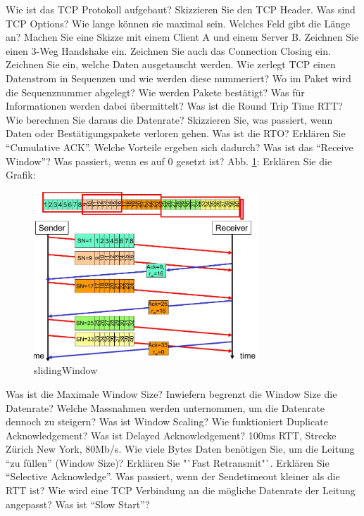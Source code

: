 \documentclass[ngerman,a4paper,12pt]{scrreprt}
\begin{document}
\olR
	\li Wie ist das TCP Protokoll aufgebaut? Skizzieren Sie den TCP Header.
	\li Was sind TCP Options? Wie lange können sie maximal sein. Welches Feld gibt die Länge an?
	\li Machen Sie eine Skizze mit einem Client A und einem Server B. Zeichnen Sie einen 3-Weg Handshake ein. Zeichnen Sie auch das Connection Closing ein. Zeichnen Sie ein, welche Daten ausgetauscht werden.
	\li Wie zerlegt TCP einen Datenstrom in Sequenzen und wie werden diese nummeriert? Wo im Paket wird die Sequenznummer abgelegt?
	 \li Wie werden Pakete bestätigt? Was für Informationen werden dabei übermittelt?
	 \li Was ist die Round Trip Time RTT? Wie berechnen Sie daraus die Datenrate?
	 \li Skizzieren Sie, was passiert, wenn Daten oder Bestätigungspakete verloren gehen. Was ist die RTO?
	 \li Erklären Sie "`Cumulative ACK"'. Welche Vorteile ergeben sich dadurch?
	 \li Was ist das "`Receive Window"'? Was passiert, wenn es auf 0 gesetzt ist?
	 \li Abb. \ref{slidingWindow}: Erklären Sie die Grafik:	 
		\begin{figure}[H]
			\centering
			\includegraphics[width=0.75\textwidth]{img/V11.19.jpg}
			\caption{slidingWindow}
			\label{slidingWindow}
		\end{figure}
	\li Was ist die Maximale Window Size? Inwiefern begrenzt die Window Size die Datenrate?
	\li Welche Massnahmen werden unternommen, um die Datenrate dennoch zu steigern?
	\li Was ist Window Scaling?
	\li Wie funktioniert Duplicate Acknowledgement?
	\li Was ist Delayed Acknowledgement?
	\li 100ms RTT, Strecke Zürich New York, 80Mb/s. Wie viele Bytes Daten benötigen Sie, um die Leitung "`zu füllen"' (Window Size)?
	\li Erklären Sie "`Fast Retransmit"`.
	\li Erklären Sie "`Selective Acknowledge"'.
	\li Was passiert, wenn der Sendetimeout kleiner als die RTT ist?
	\li Wie wird eine TCP Verbindung an die mögliche Datenrate der Leitung angepasst? Was ist "`Slow Start"'?
\olS
\end{document}

